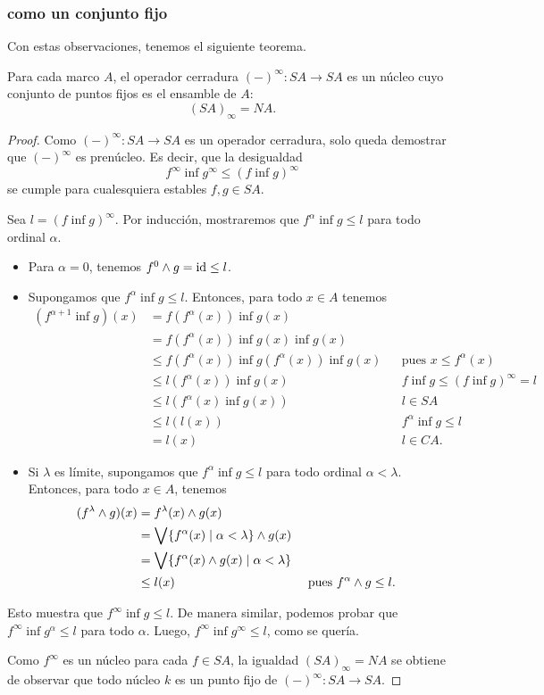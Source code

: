 \subsubsection{ como un conjunto fijo}
Con estas observaciones, tenemos el siguiente teorema.
\begin{theorem}
  Para cada marco $A$, el operador cerradura $({-})^\infty:SA\to
  SA$ es un núcleo cuyo conjunto de puntos fijos es el ensamble
  de $A$:
  \[
    (SA)_\infty = NA
  .\]
\end{theorem}
\begin{proof}
  Como $({-})^\infty:SA\to SA$ es un operador cerradura,
  solo queda demostrar que $(-)^\infty$ es prenúcleo.
  Es decir, que la desigualdad
  \[
    f^\infty \inf g^\infty \leq (f\inf g)^\infty
  \]
  se cumple para cualesquiera estables $f,g\in SA$.

  Sea $l=(f \inf g)^\infty$.
  Por inducción, mostraremos que $f^\alpha\inf g\leq l$ para todo
  ordinal $\alpha$.
  \begin{itemize}
    \item Para $\alpha=0$, tenemos $f^0\wedge g=\mathrm{id} \leq l$.
    \item Supongamos que $f^\alpha\inf g\leq l$.
    Entonces, para todo $x\in A$ tenemos
    \begin{align*}
      (f^{\alpha+1}\inf g)(x)
      &= f(f^\alpha(x)) \inf g(x) \\
      &= f(f^\alpha(x)) \inf g(x) \inf g(x) \\
      &\leq f(f^\alpha(x)) \inf g(f^\alpha(x)) \inf g(x)
        && \text{pues } x\leq f^\alpha(x) \\
      &\leq l(f^\alpha(x)) \inf g(x) && f\inf g\leq (f\inf
      g)^\infty =l \\
      &\leq l(f^\alpha(x) \inf g(x)) && l\in SA \\
      &\leq l(l(x)) && f^\alpha\inf g\leq l \\
      &= l(x) && l\in CA.
    \end{align*}
    \item
    Si $\lambda$ es límite, supongamos que $f^\alpha\inf g\leq l$
    para todo ordinal $\alpha <\lambda$.
    Entonces, para todo $x\in A$, tenemos
    \begin{align*}
      (f^\lambda\wedge g)(x)
      &= f^\lambda(x) \wedge g(x) \\
      &= \bigvee\{f^\alpha(x) \mid \alpha<\lambda\} \wedge g(x) \\
      &= \bigvee\{f^\alpha(x)\wedge g(x) \mid \alpha<\lambda\} \\
      &\leq l(x) && \text{ pues } f^\alpha\wedge g\leq l.
    \end{align*}
  \end{itemize}
  Esto muestra que $f^\infty \inf g\leq l$.
  De manera similar, podemos probar que $f^\infty \inf
  g^\alpha\leq l$ para todo $\alpha$.
  Luego, $f^\infty \inf g^\infty \leq l$, como se quería.

  Como $f^\infty$ es un núcleo para cada $f\in SA$, la
  igualdad $(SA)_\infty=NA$ se obtiene de observar que todo
  núcleo $k$ es un punto fijo de $({-})^\infty:SA\to SA$.
\end{proof}


